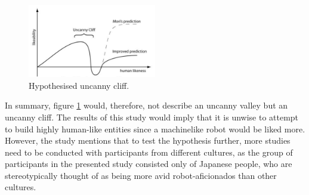 \begin{figure} %
    \centering
    \includegraphics[width=0.5\textwidth]{graphics/uncanny_cliff.png}
    \caption{Hypothesised uncanny cliff.}
    \label{fig:uncannyCliff}
\end{figure}
In summary, figure \ref{fig:uncannyCliff} would, therefore, not describe an uncanny valley but an uncanny cliff.
The results of this study would imply that it is unwise to attempt to build highly human-like entities since a machinelike robot would be liked more. However, the study mentions that to test the hypothesis further, more studies need to be conducted with participants from different cultures, as the group of participants in the presented study consisted only of Japanese people, who are stereotypically thought of as being more avid robot-aficionados than other cultures.


